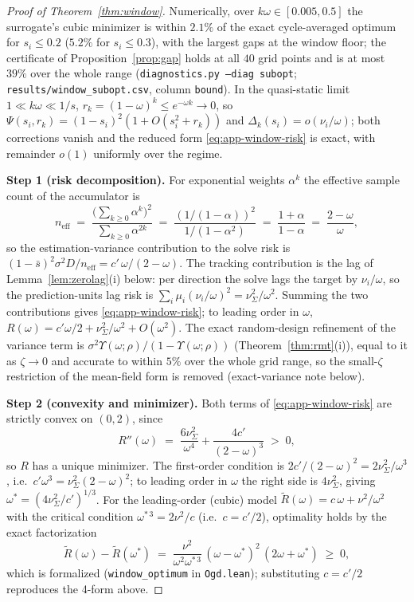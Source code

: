\begin{proof}[Proof of Theorem~\ref{thm:window}]
Numerically, over $k\omega \in [0.005,0.5]$ the surrogate's cubic minimizer is within $2.1\%$ of the exact cycle-averaged optimum for $s_i \le 0.2$ ($5.2\%$ for $s_i \le 0.3$), with the largest gaps at the window floor; the certificate of Proposition~\ref{prop:gap} holds at all $40$ grid points and is at most $39\%$ over the whole range (\texttt{diagnostics.py --diag subopt}; \texttt{results/window\_subopt.csv}, column \texttt{bound}).
In the quasi-static limit $1 \ll k\omega \ll 1/s$, $r_k=(1-\omega)^k \le e^{-\omega k} \to 0$, so $\Psi(s_i,r_k)=(1-s_i)^2(1+O(s_i^2+r_k))$ and $\Delta_k(s_i)=o(\nu_i/\omega)$; both corrections vanish and the reduced form \eqref{eq:app-window-risk} is exact, with remainder $o(1)$ uniformly over the regime.

\textbf{Step 1 (risk decomposition).}
For exponential weights $\alpha^k$ the effective sample count of the accumulator is
\[
  n_{\mathrm{eff}}
  \;=\; \frac{\bigl(\sum_{k \ge 0} \alpha^k\bigr)^2}{\sum_{k \ge 0} \alpha^{2k}}
  \;=\; \frac{(1/(1-\alpha))^2}{1/(1-\alpha^2)}
  \;=\; \frac{1 + \alpha}{1 - \alpha}
  \;=\; \frac{2-\omega}{\omega},
\]
so the estimation-variance contribution to the solve risk is $(1-\bar s)^2 \sigma^2 D/n_{\mathrm{eff}} = c'\,\omega/(2-\omega)$.
The tracking contribution is the lag of Lemma~\ref{lem:zerolag}(i) below: per direction the solve lags the target by $\nu_i/\omega$, so the prediction-units lag risk is $\sum_i \mu_i (\nu_i/\omega)^2 = \nu^2_\Sigma/\omega^2$.
Summing the two contributions gives \eqref{eq:app-window-risk}; to leading order in $\omega$, $R(\omega) = c'\omega/2 + \nu^2_\Sigma/\omega^2 + O(\omega^2)$.
The exact random-design refinement of the variance term is $\sigma^2\Upsilon(\omega;\rho)/(1-\Upsilon(\omega;\rho))$ (Theorem~\ref{thm:rmt}(i)), equal to it as $\zeta \to 0$ and accurate to within $5\%$ over the whole grid range, so the small-$\zeta$ restriction of the mean-field form is removed (exact-variance note below).

\textbf{Step 2 (convexity and minimizer).}
Both terms of \eqref{eq:app-window-risk} are strictly convex on $(0, 2)$, since
\[
  R''(\omega) \;=\; \frac{6\nu^2_\Sigma}{\omega^4} + \frac{4c'}{(2-\omega)^3} \;>\; 0,
\]
so $R$ has a unique minimizer.
The first-order condition is $2c'/(2-\omega)^2 = 2\nu^2_\Sigma/\omega^3$, i.e.\ $c' \omega^3 = \nu^2_\Sigma (2 - \omega)^2$; to leading order in $\omega$ the right side is $4\nu^2_\Sigma$, giving $\omega^* = (4\nu^2_\Sigma/c')^{1/3}$.
For the leading-order (cubic) model $\widetilde R(\omega) = c\,\omega + \nu^2/\omega^2$ with the critical condition $\omega^{*\,3} = 2\nu^2/c$ (i.e.\ $c = c'/2$), optimality holds by the exact factorization
\[
  \widetilde R(\omega) - \widetilde R(\omega^*)
  \;=\; \frac{\nu^2}{\omega^2 \omega^{*\,3}}\,(\omega - \omega^*)^2\,(2\omega + \omega^*) \;\ge\; 0,
\]
which is formalized (\texttt{window\_optimum} in \texttt{Ogd.lean}); substituting $c = c'/2$ reproduces the 4-form above.


\end{proof}
